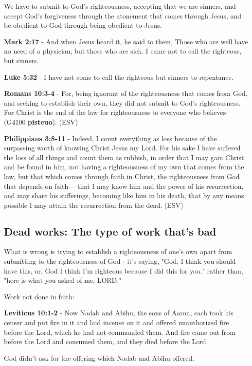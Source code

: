 \documentclass[11pt]{article}
\begin{document}
We have to submit to God's righteousness, accepting that we are sinners, and accept God's forgiveness through the atonement that comes through Jesus, and be obedient to God through being obedient to Jesus.

\textbf{Mark 2:17} - And when Jesus heard it, he said to them, Those who are well have no need of a physician, but those who are sick. I came not to call the righteous, but sinners.

\textbf{Luke 5:32} - I have not come to call the righteous but sinners to repentance.

\textbf{Romans 10:3-4} - For, being ignorant of the righteousness that comes from God, and seeking to establish their own, they did not submit to God's righteousness. For Christ is the end of the law for righteousness to everyone who believes (G4100 \textbf{pisteuo}). (ESV)

\textbf{Philippians 3:8-11} - Indeed, I count everything as loss because of the surpassing worth of knowing Christ Jesus my Lord. For his sake I have suffered the loss of all things and count them as rubbish, in order that I may gain Christ and be found in him, not having a righteousness of my own that comes from the law, but that which comes through faith in Christ, the righteousness from God that depends on faith— that I may know him and the power of his resurrection, and may share his sufferings, becoming like him in his death, that by any means possible I may attain the resurrection from the dead. (ESV)

\subsection{Dead works: The type of work that's bad}
\label{sec:orga5bf2ff}
What is wrong is trying to establish a righteousness of one's own apart from submitting to the righteousness of God - it's saying, "God, I think you should have this, or, God I think I'm righteous because I did this for you." rather than, "here is what you asked of me, LORD."

Work not done in faith:

\textbf{Leviticus 10:1-2} - Now Nadab and Abihu, the sons of Aaron, each took his censer and put fire in it and laid incense on it and offered unauthorized fire before the Lord, which he had not commanded them. And fire came out from before the Lord and consumed them, and they died before the Lord.

God didn't ask for the offering which Nadab and Abihu offered.
\end{document}
